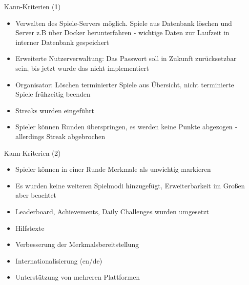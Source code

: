 \documentclass[xcolor=dvipsnames]{beamer}
\begin{document}
\begin{frame}{Kann-Kriterien (1)}
  \begin{itemize}
    \item Verwalten des Spiele-Servers möglich. Spiele aus Datenbank löschen und Server z.B über Docker herunterfahren - wichtige Daten zur Laufzeit in interner Datenbank gespeichert \\
    \item Erweiterte Nutzerverwaltung: Das Passwort soll in Zukunft zurücksetzbar sein, bis jetzt wurde das nicht implementiert \\
    \item Organisator: Löschen terminierter Spiele aus Übersicht, nicht terminierte Spiele frühzeitig beenden \\
    \item Streaks wurden eingeführt \\
    \item Spieler können Runden überspringen, es werden keine Punkte abgezogen - allerdings Streak abgebrochen \\
  \end{itemize}
\end{frame}
\begin{frame}{Kann-Kriterien (2)}
  \begin{itemize}
    \item Spieler können in einer Runde Merkmale als unwichtig markieren \\
    \item Es wurden keine weiteren Spielmodi hinzugefügt, Erweiterbarkeit im Großen aber beachtet \\
    \item Leaderboard, Achievements, Daily Challenges wurden umgesetzt \\
    \item Hilfstexte \\
    \item Verbesserung der Merkmalsbereitstellung \\
    \item Internationalisierung (en/de) \\
    \item Unterstützung von mehreren Plattformen \\
  \end{itemize}
\end{frame}
\end{document}
